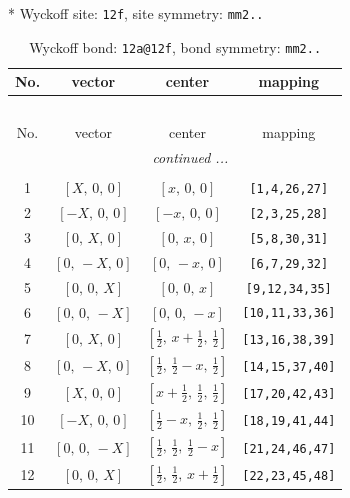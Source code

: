 \documentclass[fleqn,8pt]{jsarticle}
\begin{document}
* Wyckoff site: {\tt 12f}, site symmetry: {\tt mm2..}
\renewcommand{\arraystretch}{1.2}
\begin{longtable}{cccc}
\caption{Wyckoff bond: {\tt 12a@12f}, bond symmetry: {\tt mm2..}}
 \\
 \hline \hline
No. & vector & center & mapping \\ \hline \endfirsthead

\multicolumn{3}{l}{\tablename\ \thetable{}} \\
 \hline \hline
No. & vector & center & mapping \\ \hline \endhead

 \hline \hline
\multicolumn{3}{r}{\footnotesize\it continued ...} \\ \endfoot

 \hline \hline
\multicolumn{3}{r}{} \\ \endlastfoot

1 & $\left[ X,\, 0,\, 0 \right]$ & $\left[ x,\, 0,\, 0 \right]$ & {\tt [1,4,26,27]} \\ \hline
2 & $\left[ - X,\, 0,\, 0 \right]$ & $\left[ - x,\, 0,\, 0 \right]$ & {\tt [2,3,25,28]} \\ \hline
3 & $\left[ 0,\, X,\, 0 \right]$ & $\left[ 0,\, x,\, 0 \right]$ & {\tt [5,8,30,31]} \\ \hline
4 & $\left[ 0,\, - X,\, 0 \right]$ & $\left[ 0,\, - x,\, 0 \right]$ & {\tt [6,7,29,32]} \\ \hline
5 & $\left[ 0,\, 0,\, X \right]$ & $\left[ 0,\, 0,\, x \right]$ & {\tt [9,12,34,35]} \\ \hline
6 & $\left[ 0,\, 0,\, - X \right]$ & $\left[ 0,\, 0,\, - x \right]$ & {\tt [10,11,33,36]} \\ \hline
7 & $\left[ 0,\, X,\, 0 \right]$ & $\left[ \frac{1}{2},\, x + \frac{1}{2},\, \frac{1}{2} \right]$ & {\tt [13,16,38,39]} \\ \hline
8 & $\left[ 0,\, - X,\, 0 \right]$ & $\left[ \frac{1}{2},\, \frac{1}{2} - x,\, \frac{1}{2} \right]$ & {\tt [14,15,37,40]} \\ \hline
9 & $\left[ X,\, 0,\, 0 \right]$ & $\left[ x + \frac{1}{2},\, \frac{1}{2},\, \frac{1}{2} \right]$ & {\tt [17,20,42,43]} \\ \hline
10 & $\left[ - X,\, 0,\, 0 \right]$ & $\left[ \frac{1}{2} - x,\, \frac{1}{2},\, \frac{1}{2} \right]$ & {\tt [18,19,41,44]} \\ \hline
11 & $\left[ 0,\, 0,\, - X \right]$ & $\left[ \frac{1}{2},\, \frac{1}{2},\, \frac{1}{2} - x \right]$ & {\tt [21,24,46,47]} \\ \hline
12 & $\left[ 0,\, 0,\, X \right]$ & $\left[ \frac{1}{2},\, \frac{1}{2},\, x + \frac{1}{2} \right]$ & {\tt [22,23,45,48]} \\
\end{longtable}
\end{document}
